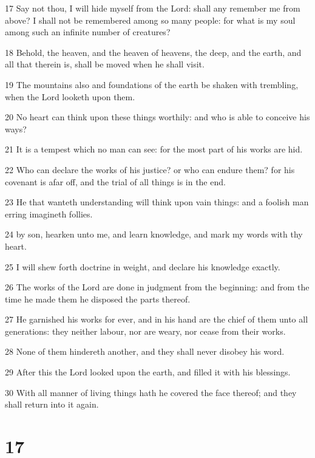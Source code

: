 \par 17 Say not thou, I will hide myself from the Lord: shall any remember me from above? I shall not be remembered among so many people: for what is my soul among such an infinite number of creatures?
\par 18 Behold, the heaven, and the heaven of heavens, the deep, and the earth, and all that therein is, shall be moved when he shall visit.
\par 19 The mountains also and foundations of the earth be shaken with trembling, when the Lord looketh upon them.
\par 20 No heart can think upon these things worthily: and who is able to conceive his ways?
\par 21 It is a tempest which no man can see: for the most part of his works are hid.
\par 22 Who can declare the works of his justice? or who can endure them? for his covenant is afar off, and the trial of all things is in the end.
\par 23 He that wanteth understanding will think upon vain things: and a foolish man erring imagineth follies.
\par 24 by son, hearken unto me, and learn knowledge, and mark my words with thy heart.
\par 25 I will shew forth doctrine in weight, and declare his knowledge exactly.
\par 26 The works of the Lord are done in judgment from the beginning: and from the time he made them he disposed the parts thereof.
\par 27 He garnished his works for ever, and in his hand are the chief of them unto all generations: they neither labour, nor are weary, nor cease from their works.
\par 28 None of them hindereth another, and they shall never disobey his word.
\par 29 After this the Lord looked upon the earth, and filled it with his blessings.
\par 30 With all manner of living things hath he covered the face thereof; and they shall return into it again.

\chapter{17}

